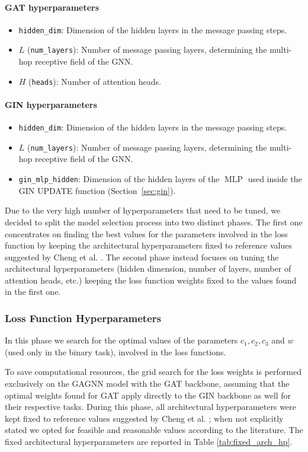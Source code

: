 \paragraph{GAT hyperparameters}
\begin{itemize}
  \item \texttt{hidden\_dim}: Dimension of the hidden layers in the message passing steps.
  \item \(L\) (\texttt{num\_layers}): Number of message passing layers, determining the multi-hop receptive field of the GNN.
  \item \(H\) (\texttt{heads}): Number of attention heads.
\end{itemize}
\paragraph{GIN hyperparameters}
\begin{itemize}
  \item \texttt{hidden\_dim}: Dimension of the hidden layers in the message passing steps.
  \item \(L\) (\texttt{num\_layers}): Number of message passing layers, determining the multi-hop receptive field of the GNN.
  \item \texttt{gin\_mlp\_hidden}: Dimension of the hidden layers of the \(\operatorname{MLP}\) used inside the GIN UPDATE function (Section~\ref{sec:gin}).
\end{itemize}
Due to the very high number of hyperparameters that need to be tuned, we decided to split the model selection process into two distinct phases. The first one concentrates on finding the best values for the parameters involved in the loss function by keeping the architectural hyperparameters fixed to reference values suggested by Cheng et al. \cite{mainpaper}. 
The second phase instead focuses on tuning the architectural hyperparameters (hidden dimension, number of layers, number of attention heads, etc.) keeping the loss function weights fixed to the values found in the first one.

\subsubsection{Loss Function Hyperparameters}
\label{sec:loss_hp}

In this phase we search for the optimal values of the parameters \(c_1, c_2, c_3\) and \(w\) (used only in the binary task), involved in the loss functions. 

To save computational resources, the grid search for the loss weights is performed exclusively on the GAGNN model with the GAT backbone, assuming that the optimal weights found for GAT apply directly to the GIN backbone as well for their respective tasks. During this phase, all architectural hyperparameters were kept fixed to reference values suggested by Cheng et al. \cite{mainpaper}; when not explicitly stated we opted for feasible and reasonable values according to the literature. The fixed architectural hyperparameters are reported in Table \ref{tab:fixed_arch_hp}.

